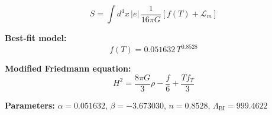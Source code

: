 
\begin{equation}
  S = \int d^4x \, |e| \, \frac{1}{16\pi G} \left[ f(T) + \mathcal{L}_m \right]
\end{equation}

\textbf{Best-fit model:}
\begin{equation}
  f(T) = 0.051632 \, T^{0.8528}
\end{equation}

\textbf{Modified Friedmann equation:}
\begin{equation}
  H^2 = \frac{8\pi G}{3} \rho - \frac{f}{6} + \frac{T f_T}{3}
\end{equation}

\textbf{Parameters:}
$\alpha = 0.051632$, \quad
$\beta = -3.673030$, \quad
$n = 0.8528$, \quad
$\Lambda_{\text{BI}} = 999.4622$